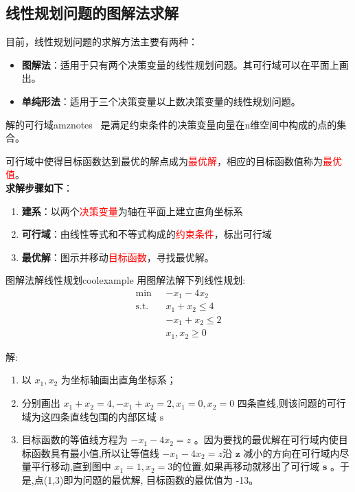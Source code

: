     \subsection{线性规划问题的图解法求解}
    目前，线性规划问题的求解方法主要有两种：
    \begin{itemize}[noitemsep]
        \item \textbf{图解法}：适用于只有两个决策变量的线性规划问题。其可行域可以在平面上画出。
        \item \textbf{单纯形法}：适用于三个决策变量以上数决策变量的线性规划问题。
    \end{itemize}
    \begin{dfnbox}{解的可行域}{amznotes}
         \ 是满足约束条件的决策变量向量在n维空间中构成的点的集合。
    \end{dfnbox}
    可行域中使得目标函数达到最优的解点成为\textcolor{red}{最优解}，相应的目标函数值称为\textcolor{red}{最优值}。
    \\
    \textbf{求解步骤如下}：
    \begin{enumerate}
        \item \textbf{建系}：以两个\textcolor{red}{决策变量}为轴在平面上建立直角坐标系
        \item \textbf{可行域}：由线性等式和不等式构成的\textcolor{red}{约束条件}，标出可行域
        \item \textbf{最优解}：图示并移动\textcolor{red}{目标函数}，寻找最优解。
    \end{enumerate}
    \begin{exbox}{图解法解线性规划}{coolexample}
        用图解法解下列线性规划:
        \begin{align*}
                \min \; & - x_1 - 4x_2 \\
                \text{s.t.} \quad & x_1 + x_2 \leq 4 \\
                & - x_1 + x_2 \leq 2 \\
                & x_1, x_2 \geq 0
        \end{align*}

        解:
        \begin{enumerate}
            \item 以 ${x}_{1},{x}_{2}$ 为坐标轴画出直角坐标系；
            \item 分别画出 ${x}_{1} + {x}_{2} = 4, - {x}_{1} + {x}_{2} = 2,{x}_{1} = 0,{x}_{2} = 0$ 四条直线,则该问题的可行域为这四条直线包围的内部区域 $\mathrm{s}$ 
            \item 目标函数的等值线方程为 $- {x}_{1} - 4{x}_{2} = z$ 。因为要找的最优解在可行域内使目标函数具有最小值,所以让等值线 $- {x}_{1} - 4{x}_{2} = z$沿 $\mathbf{z}$ 减小的方向在可行域内尽量平行移动,直到图中 ${x}_{1} = 1,{x}_{2} = 3$的位置,如果再移动就移出了可行域 $\mathbf{s}$ 。于是,点(1,3)即为问题的最优解, 目标函数的最优值为 -13。
        \end{enumerate}
    \end{exbox}
